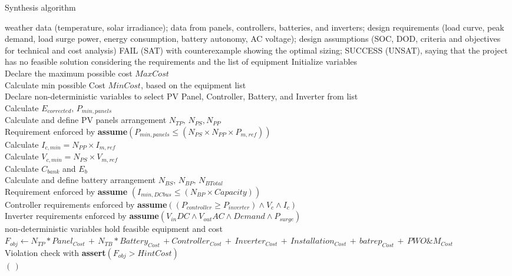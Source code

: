 \documentclass[runningheads]{llncs}
\begin{document}
 \begin{algorithm}[h]
 \caption{Synthesis algorithm}
 \begin{algorithmic}[1]
 \renewcommand{\algorithmicrequire}{\textbf{Input:}}
 \renewcommand{\algorithmicensure}{\textbf{Output:}}
 \REQUIRE weather data (temperature, solar irradiance); data from panels, controllers, batteries, and inverters; design requirements (load curve, peak demand, load surge power, energy consumption, battery autonomy, AC voltage); design assumptions (SOC, DOD, criteria and objectives for technical and cost analysis)
 \ENSURE FAIL (SAT) with counterexample showing the optimal sizing; SUCCESS (UNSAT), saying that the project has no feasible solution considering the requirements and the list of equipment
 \STATE Initialize variables \\
 \STATE Declare the maximum possible cost $MaxCost$ \\
 \STATE Calculate min possible Cost $MinCost$, based on the equipment list \\
 	\STATE Declare non-deterministic variables to select PV Panel, Controller, Battery, and Inverter from list \\
 	\STATE Calculate $E_{corrected}, \, P_{min,panels} $ \\
	\STATE Calculate and define PV panels arrangement $N_{TP}, \, N_{PS}, N_{PP} $ \\
	\STATE Requirement enforced by \textbf{assume}$(P_{min,panels} \leq (N_{PS} \times N_{PP} \times P_{m,ref}))$ \\
	\STATE Calculate $I_{c,min} = N_{PP} \times I_{m,ref}$ \\
	\STATE Calculate $V_{c,min} = N_{PS} \times V_{m,ref}$ \\
 	\STATE Calculate $C_{bank}$ and $E_{b}$ \\
	\STATE Calculate and define battery arrangement $N_{BS}, \, N_{BP}, \, N_{BTotal}$ \\
	\STATE Requirement enforced by \textbf{assume} $(I_{min,DCbus} \leq (N_{BP} \times Capacity))$ \\
 	\STATE Controller requirements enforced by \textbf{assume}$((P_{controller} \geq P_{inverter}) \wedge V_{c} \wedge I_{c})$ \\
	\STATE Inverter requirements enforced by \textbf{assume}$(V_{in}DC \wedge V_{out}AC \wedge Demand \wedge P_{surge})$ \\
	\STATE non-deterministic variables hold feasible equipment and cost \\
	\STATE $F_{obj} \leftarrow N_{TP}*Panel_{Cost} \, + \, N_{TB}*Battery_{Cost} \, + Controller_{Cost} \, + \, Inverter_{Cost} \, + \, Installation_{Cost} \, + \, batrep_{Cost} \, + \, PWO\&M_{Cost}$ \\
	\STATE Violation check with \textbf{assert}$(F_{obj} > HintCost)$ \\
 \ENDFOR
 \RETURN $(\,)$ 
 \end{algorithmic} 
 \label{alg:opt-algorithm}
 \end{algorithm}
\end{document}
